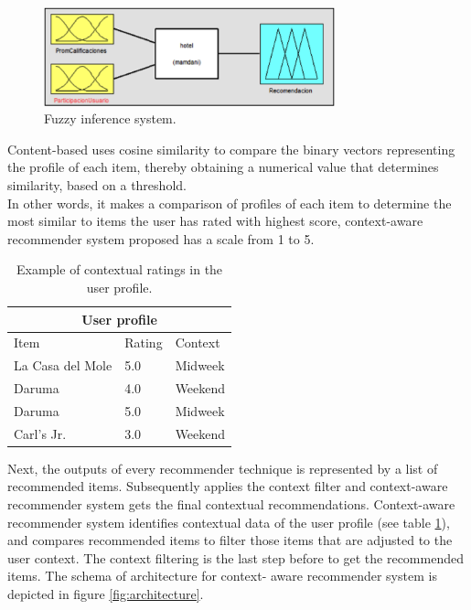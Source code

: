 \begin{figure}
\captionsetup{justification=centering,margin=2cm,font=footnotesize}
\centering
\setlength\fboxsep{0pt}
\setlength\fboxrule{0.7pt}
\includegraphics[width=0.75\textwidth]{img/fis.png}
\caption{Fuzzy inference system.}
\label{fig:fis}   
\end{figure}
Content-based uses cosine similarity to compare the binary
vectors representing the profile of each item, thereby obtaining a
numerical value that determines similarity, based on a threshold. \\   
In other words, it makes a comparison of profiles of each item to
determine the most similar to items the user has rated with highest
score, context-aware recommender system proposed has a scale 
from 1 to 5. 
\begin{table}[htb]
\small
\centering
\captionsetup{font=footnotesize}
\caption{Example of contextual ratings in the user profile.}
\label{tab:2}
\small
\begin{tabular}{lll}
\hline
\multicolumn{3}{c}{\textbf{User profile}} \\ \hline
Item & Rating & Context \\ \hline
La Casa del Mole & 5.0 & Midweek \\ 
Daruma           & 4.0 & Weekend \\ 
Daruma           & 5.0 & Midweek \\ 
Carl's Jr.       & 3.0 & Weekend \\ \hline
\end{tabular}
\end{table}
Next, the outputs of every recommender technique is represented by a
list of recommended items. Subsequently applies the context filter and
context-aware recommender system gets the final contextual
recommendations. Context-aware recommender system identifies
contextual data of the user profile (see table \ref{tab:2}), and
compares recommended items to filter those items that are adjusted to
the user context.  The context filtering is the last step before to
get the recommended items. The schema of architecture for context-
aware recommender system is depicted in figure \ref{fig:architecture}.
